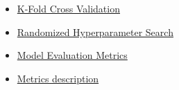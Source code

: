 \documentclass{article}
\begin{document}
\begin{itemize}
    \item \href{https://scikit-learn.org/stable/modules/generated/sklearn.model_selection.StratifiedKFold.html}{K-Fold Cross Validation}
    
    \item \href{https://scikit-learn.org/stable/modules/generated/sklearn.model_selection.RandomizedSearchCV.html}{Randomized Hyperparameter Search}
    
    \item \href{https://scikit-learn.org/stable/modules/model_evaluation.html#classification-metrics}{Model Evaluation Metrics}
    
    \item \href{https://www.v7labs.com/blog/f1-score-guide}{Metrics description}

\end{itemize}
\end{document}
